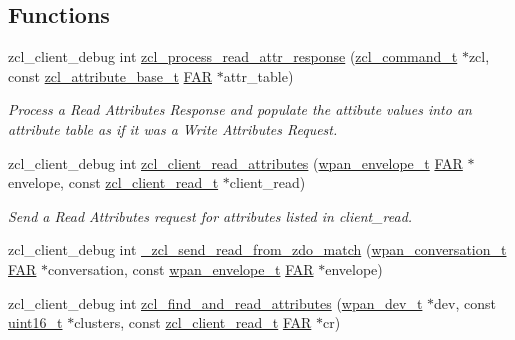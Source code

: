 \subsection*{Functions}
\begin{DoxyCompactItemize}
\item 
zcl\-\_\-client\-\_\-debug int \hyperlink{group__zcl__client_gae0892d22ee69940130d1111960401339}{zcl\-\_\-process\-\_\-read\-\_\-attr\-\_\-response} (\hyperlink{structzcl__command__t}{zcl\-\_\-command\-\_\-t} $\ast$zcl, const \hyperlink{structzcl__attribute__base__t}{zcl\-\_\-attribute\-\_\-base\-\_\-t} \hyperlink{group__hal_gaef060b3456fdcc093a7210a762d5f2ed}{F\-A\-R} $\ast$attr\-\_\-table)
\begin{DoxyCompactList}\small\item\em Process a Read Attributes Response and populate the attibute values into an attribute table as if it was a Write Attributes Request. \end{DoxyCompactList}\item 
zcl\-\_\-client\-\_\-debug int \hyperlink{group__zcl__client_ga24a7c15cdfe484aff260848694fccae2}{zcl\-\_\-client\-\_\-read\-\_\-attributes} (\hyperlink{structwpan__envelope__t}{wpan\-\_\-envelope\-\_\-t} \hyperlink{group__hal_gaef060b3456fdcc093a7210a762d5f2ed}{F\-A\-R} $\ast$envelope, const \hyperlink{structzcl__client__read__t}{zcl\-\_\-client\-\_\-read\-\_\-t} $\ast$client\-\_\-read)
\begin{DoxyCompactList}\small\item\em Send a Read Attributes request for attributes listed in {\ttfamily client\-\_\-read}. \end{DoxyCompactList}\item 
zcl\-\_\-client\-\_\-debug int \hyperlink{group__zcl__client_ga15f191f3166c71f3f436b2a32d108a9f}{\-\_\-zcl\-\_\-send\-\_\-read\-\_\-from\-\_\-zdo\-\_\-match} (\hyperlink{structwpan__conversation__t}{wpan\-\_\-conversation\-\_\-t} \hyperlink{group__hal_gaef060b3456fdcc093a7210a762d5f2ed}{F\-A\-R} $\ast$conversation, const \hyperlink{structwpan__envelope__t}{wpan\-\_\-envelope\-\_\-t} \hyperlink{group__hal_gaef060b3456fdcc093a7210a762d5f2ed}{F\-A\-R} $\ast$envelope)
\item 
zcl\-\_\-client\-\_\-debug int \hyperlink{group__zcl__client_gae673efbd325cea1f3befacda58332191}{zcl\-\_\-find\-\_\-and\-\_\-read\-\_\-attributes} (\hyperlink{structwpan__dev__t}{wpan\-\_\-dev\-\_\-t} $\ast$dev, const \hyperlink{group__hal_ga5a8b2dc9e45a9ee81a94ef304fb62505}{uint16\-\_\-t} $\ast$clusters, const \hyperlink{structzcl__client__read__t}{zcl\-\_\-client\-\_\-read\-\_\-t} \hyperlink{group__hal_gaef060b3456fdcc093a7210a762d5f2ed}{F\-A\-R} $\ast$cr)

\end{DoxyCompactItemize}
